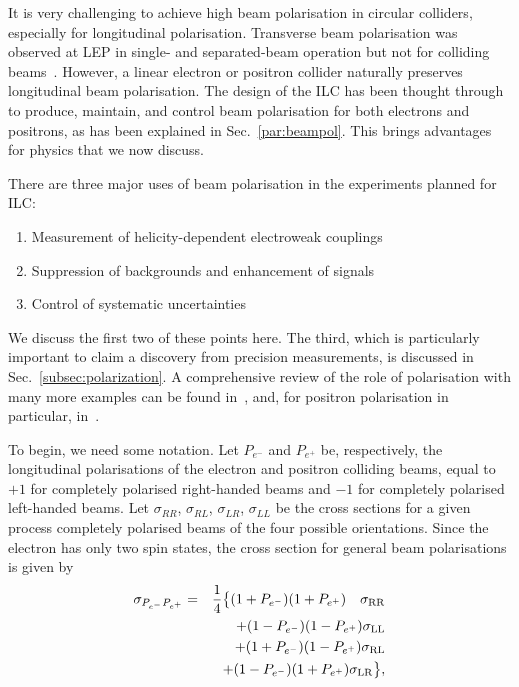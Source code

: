 It is very challenging to achieve high beam polarisation in circular colliders, especially for longitudinal polarisation.   Transverse beam polarisation was observed at LEP in single- and separated-beam operation but not for 
colliding beams~\cite{Assmann:1998qb}.  However,  a linear electron or positron
collider naturally preserves longitudinal beam polarisation.    The design of the 
ILC has been thought through  to produce, maintain, and control 
beam polarisation for both electrons and positrons, as has been explained in 
Sec.~\ref{par:beampol}.  This brings advantages for physics that we now discuss.

There are three major uses of beam polarisation in the experiments planned for ILC:
\begin{enumerate}
\item  Measurement of helicity-dependent electroweak couplings
\item Suppression of backgrounds and enhancement of signals
\item  Control of systematic uncertainties
\end{enumerate}
We discuss the first two of these points here.  The third, which is particularly 
important to claim a discovery from  precision measurements, is discussed in Sec.~\ref{subsec:polarization}.  A comprehensive review of the role of polarisation with many more examples can be found in~\cite{MoortgatPick:2005cw}, and, for  positron polarisation in particular, in~\cite{Fujii:2018mli}. 

To begin, we need some notation. Let $P_{e^-}$ and $P_{e^+}$ be, respectively, the longitudinal polarisations of the electron and positron colliding beams, equal to $+1$ for completely polarised right-handed beams and $-1$ for completely polarised left-handed beams.   Let $\sigma_{RR}$, $\sigma_{RL}$, $\sigma_{LR}$, $\sigma_{LL}$ be the cross sections for a given process completely polarised beams of the four possible orientations.  Since the electron has only two spin  states, the 
cross section for general beam  polarisations is given by 
\begin{eqnarray}
\sigma_{P_{e^-}P_{e^+}} &=& \frac{1}{4}\bigl\{
     (1+P_{e^-})(1+P_{e^+}) \quad \sigma_{\mathrm{RR}}  \nonumber \\
&& + (1-P_{e^-})(1-P_{e^+}) \sigma_{\mathrm{LL}} \nonumber \\
&& + (1+P_{e^-})(1-P_{e^+}) \sigma_{\mathrm{RL}} \nonumber \\ 
&& + (1-P_{e^-})(1+P_{e^+}) \sigma_{\mathrm{LR}} \bigr\},
\label{eq:pol:xsec}
\end{eqnarray}

